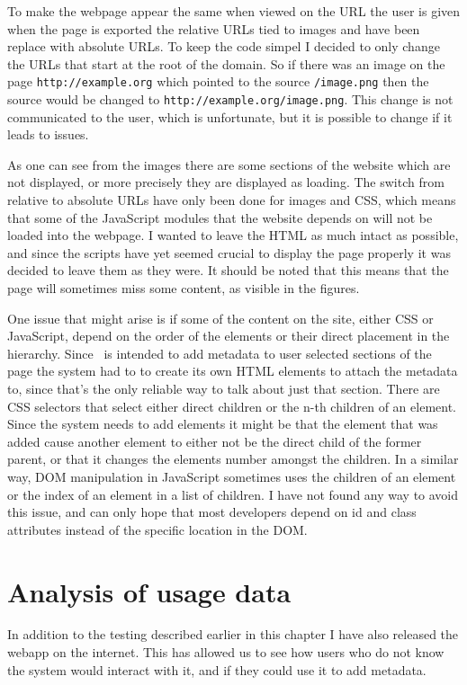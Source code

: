 To make the webpage appear the same when viewed on the URL the user is given when the page is exported
the relative URLs tied to images and  have been replace with absolute URLs.
To keep the code simpel I decided to only change the URLs that start at the root of the domain.
So if there was an image on the page \texttt{http://example.org} which pointed to the source \texttt{/image.png}
then the source would be changed to \texttt{http://example.org/image.png}.
This change is not communicated to the user, which is unfortunate,
but it is possible to change if it leads to issues.

As one can see from the images there are some sections of the website which are not displayed, or more precisely they
are displayed as loading.
The switch from relative to absolute URLs have only been done for images and CSS,
which means that some of the JavaScript modules that the website depends on will not be loaded into the webpage.
I wanted to leave the HTML as much intact as possible,
and since the scripts have yet seemed crucial to display the page properly it was decided to leave them as they were.
It should be noted that this means that the page will sometimes miss some content, as visible in the figures.

One issue that might arise is if some of the content on the site, either CSS or JavaScript,
depend on the order of the elements or their direct placement in the hierarchy.
Since \theartefact\ is intended to add metadata to user selected sections of the page the system had to  to create its own
HTML elements to attach the metadata to, since that's the only reliable way to talk about just that section.
There are CSS selectors that select either direct children or the n-th children of an element.
Since the system needs to add elements it might be that the element that was added cause another element to either not be the direct
child of the former parent, or that it changes the elements number amongst the children.
In a similar way, DOM manipulation in JavaScript sometimes uses the children of an element or the index of an element
in a list of children.
I have not found any way to avoid this issue,
and can only hope that most developers depend on id and class attributes instead of the specific location in the DOM.

\section{Analysis of usage data}
In addition to the testing described earlier in this chapter I have also released the webapp on the internet.
This has allowed us to see how users who do not know the system would interact with it,
and if they could use it to add metadata.

